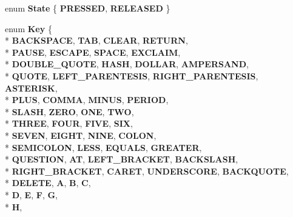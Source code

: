 \begin{DoxyCompactItemize}
\item 
enum {\bfseries State} \{ {\bfseries P\+R\+E\+S\+S\+ED}, 
{\bfseries R\+E\+L\+E\+A\+S\+ED}
 \}\hypertarget{classengine_1_1_keyboard_event_a18429e01d5cb4f456f24834b3138be9f}{}\label{classengine_1_1_keyboard_event_a18429e01d5cb4f456f24834b3138be9f}

\item 
enum {\bfseries Key} \{ \\*
{\bfseries B\+A\+C\+K\+S\+P\+A\+CE}, 
{\bfseries T\+AB}, 
{\bfseries C\+L\+E\+AR}, 
{\bfseries R\+E\+T\+U\+RN}, 
\\*
{\bfseries P\+A\+U\+SE}, 
{\bfseries E\+S\+C\+A\+PE}, 
{\bfseries S\+P\+A\+CE}, 
{\bfseries E\+X\+C\+L\+A\+IM}, 
\\*
{\bfseries D\+O\+U\+B\+L\+E\+\_\+\+Q\+U\+O\+TE}, 
{\bfseries H\+A\+SH}, 
{\bfseries D\+O\+L\+L\+AR}, 
{\bfseries A\+M\+P\+E\+R\+S\+A\+ND}, 
\\*
{\bfseries Q\+U\+O\+TE}, 
{\bfseries L\+E\+F\+T\+\_\+\+P\+A\+R\+E\+N\+T\+E\+S\+IS}, 
{\bfseries R\+I\+G\+H\+T\+\_\+\+P\+A\+R\+E\+N\+T\+E\+S\+IS}, 
{\bfseries A\+S\+T\+E\+R\+I\+SK}, 
\\*
{\bfseries P\+L\+US}, 
{\bfseries C\+O\+M\+MA}, 
{\bfseries M\+I\+N\+US}, 
{\bfseries P\+E\+R\+I\+OD}, 
\\*
{\bfseries S\+L\+A\+SH}, 
{\bfseries Z\+E\+RO}, 
{\bfseries O\+NE}, 
{\bfseries T\+WO}, 
\\*
{\bfseries T\+H\+R\+EE}, 
{\bfseries F\+O\+UR}, 
{\bfseries F\+I\+VE}, 
{\bfseries S\+IX}, 
\\*
{\bfseries S\+E\+V\+EN}, 
{\bfseries E\+I\+G\+HT}, 
{\bfseries N\+I\+NE}, 
{\bfseries C\+O\+L\+ON}, 
\\*
{\bfseries S\+E\+M\+I\+C\+O\+L\+ON}, 
{\bfseries L\+E\+SS}, 
{\bfseries E\+Q\+U\+A\+LS}, 
{\bfseries G\+R\+E\+A\+T\+ER}, 
\\*
{\bfseries Q\+U\+E\+S\+T\+I\+ON}, 
{\bfseries AT}, 
{\bfseries L\+E\+F\+T\+\_\+\+B\+R\+A\+C\+K\+ET}, 
{\bfseries B\+A\+C\+K\+S\+L\+A\+SH}, 
\\*
{\bfseries R\+I\+G\+H\+T\+\_\+\+B\+R\+A\+C\+K\+ET}, 
{\bfseries C\+A\+R\+ET}, 
{\bfseries U\+N\+D\+E\+R\+S\+C\+O\+RE}, 
{\bfseries B\+A\+C\+K\+Q\+U\+O\+TE}, 
\\*
{\bfseries D\+E\+L\+E\+TE}, 
{\bfseries A}, 
{\bfseries B}, 
{\bfseries C}, 
\\*
{\bfseries D}, 
{\bfseries E}, 
{\bfseries F}, 
{\bfseries G}, 
\\*
{\bfseries H}, 

\end{DoxyCompactItemize}
